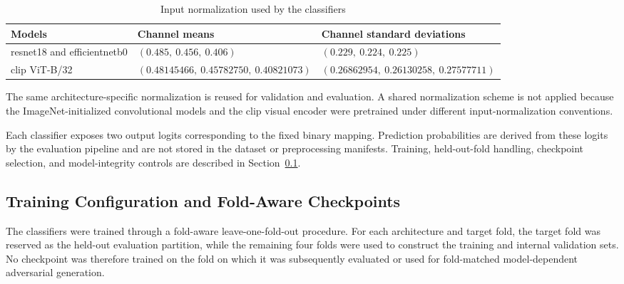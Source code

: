\begin{table}[H]
\centering
\scriptsize
\renewcommand{\arraystretch}{1.15}
\setlength{\tabcolsep}{5pt}
\caption{Input normalization used by the classifiers}
\label{tab:implementation-proxy-normalization}
\begin{tabularx}{\textwidth}{@{}p{} p{} X@{}}
\toprule
\textbf{Models} &
\textbf{Channel means} &
\textbf{Channel standard deviations} \\
\midrule

\gls{resnet18} and \gls{efficientnetb0}
&
\((0.485,\ 0.456,\ 0.406)\)
&
\((0.229,\ 0.224,\ 0.225)\) \\

\gls{clip} ViT-B/32
&
\((0.48145466,\ 0.45782750,\ 0.40821073)\)
&
\((0.26862954,\ 0.26130258,\ 0.27577711)\) \\

\bottomrule
\end{tabularx}
\end{table}

The same architecture-specific normalization is reused for validation and
evaluation. A shared normalization scheme is not applied because the
ImageNet-initialized convolutional models and the \gls{clip} visual encoder
were pretrained under different input-normalization conventions.

Each classifier exposes two output logits corresponding to the fixed binary mapping.
Prediction probabilities are derived from these logits by the evaluation
pipeline and are not stored in the dataset or preprocessing manifests.
Training, held-out-fold handling, checkpoint selection, and model-integrity
controls are described in
Section~\ref{subsec:implementation-training}.











\subsection{Training Configuration and Fold-Aware Checkpoints}
\label{subsec:implementation-training}

The classifiers were trained through a fold-aware leave-one-fold-out
procedure. For each architecture and target fold, the target fold was reserved
as the held-out evaluation partition, while the remaining four folds were used
to construct the training and internal validation sets. No checkpoint was
therefore trained on the fold on which it was subsequently evaluated or used
for fold-matched model-dependent adversarial generation.

